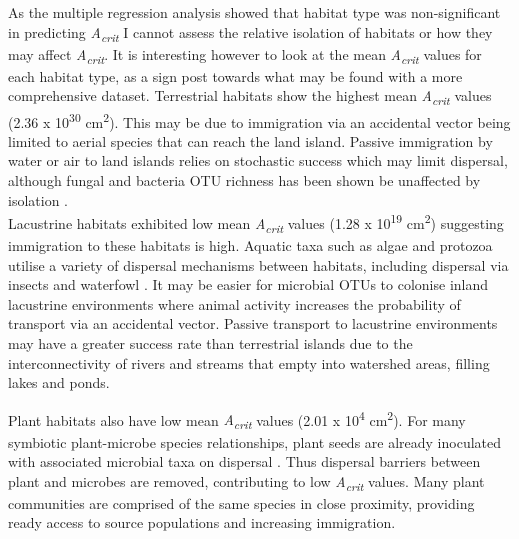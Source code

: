 \noindent As the multiple regression analysis showed that habitat type was non-significant in predicting \textit{A\textsubscript{crit}} I cannot assess the relative isolation of habitats or how they may affect \textit{A\textsubscript{crit}}. It is interesting however to look at the mean \textit{A\textsubscript{crit}} values for each habitat type, as a sign post towards what may be found with a more comprehensive dataset. Terrestrial habitats show the highest mean \textit{A\textsubscript{crit}} values (2.36 x 10\textsuperscript{30} cm\textsuperscript{2}). This may be due to immigration via an accidental vector being limited to aerial species that can reach the land island. Passive immigration by water or air to land islands relies on stochastic success which may limit dispersal, although fungal and bacteria OTU richness has been shown be unaffected by isolation \cite{li2020island}. \\

\noindent Lacustrine habitats exhibited low mean \textit{A\textsubscript{crit}} values (1.28 x 10\textsuperscript{19} cm\textsuperscript{2}) suggesting immigration to these habitats is high. Aquatic taxa such as algae and protozoa utilise a variety of dispersal mechanisms between habitats, including dispersal via insects and waterfowl \cite{stewart1966dispersal}. It may be easier for microbial OTUs to colonise inland lacustrine environments where animal activity increases the probability of transport via an accidental vector. Passive transport to lacustrine environments may have a greater success rate than terrestrial islands due to the interconnectivity of rivers and streams that empty into watershed areas, filling lakes and ponds.  

\noindent Plant habitats also have low mean \textit{A\textsubscript{crit}} values (2.01 x 10\textsuperscript{4} cm\textsuperscript{2}). For many symbiotic plant-microbe species relationships, plant seeds are already inoculated with associated microbial taxa on dispersal \cite{ho2017plant}. Thus dispersal barriers between plant and microbes are removed, contributing to low \textit{A\textsubscript{crit}} values. Many plant communities are comprised of the same species in close proximity, providing ready access to source populations and increasing immigration. 

